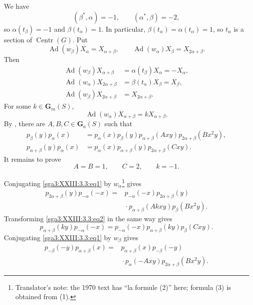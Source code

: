 We have
\[
  (\beta^*,\alpha)=-1,\qquad(\alpha^*,\beta)=-2,
\]
so \(\alpha(t_\beta)=-1\) and \(\beta(t_\alpha)=1\). In particular,
\(\beta(t_\alpha)=\alpha(t_\alpha)=1\), so \(t_\alpha\) is a section
of \(\operatorname{Centr}(G)\). Put
\[
  \operatorname{Ad}(w_\beta)X_\alpha=X_{\alpha+\beta},
  \qquad
  \operatorname{Ad}(w_\alpha)X_\beta=X_{2\alpha+\beta}.
\]
Then
\[
\begin{aligned}
  \operatorname{Ad}(w_\beta)X_{\alpha+\beta}
    &=\alpha(t_\beta)X_\alpha=-X_\alpha,\\
  \operatorname{Ad}(w_\alpha)X_{2\alpha+\beta}
    &=\beta(t_\alpha)X_\beta=X_\beta,\\
  \operatorname{Ad}(w_\beta)X_{2\alpha+\beta}
    &=X_{2\alpha+\beta}.
\end{aligned}
\]
For some \(k\in\mathbf G_m(S)\),
\[
  \operatorname{Ad}(w_\alpha)X_{\alpha+\beta}
    =kX_{\alpha+\beta}.
\]
By , there are
\(A,B,C\in\mathbf G_a(S)\) such that
\begin{align}
  p_\beta(y)p_\alpha(x)
    &=p_\alpha(x)p_\beta(y)p_{\alpha+\beta}(Axy)
      p_{2\alpha+\beta}(Bx^2y), \tag{1}\label{sga3:XXIII:3.3:eq1}\\
  p_{\alpha+\beta}(y)p_\alpha(x)
    &=p_\alpha(x)p_{\alpha+\beta}(y)
      p_{2\alpha+\beta}(Cxy). \tag{2}\label{sga3:XXIII:3.3:eq2}
\end{align}
It remains to prove
\[
  A=B=1,\qquad C=2,\qquad k=-1.
\]

Conjugating \eqref{sga3:XXIII:3.3:eq1} by \(w_\alpha\)\footnote{Translator's note: the 1970 text
has ``la formule (2)'' here; formula (3) is obtained from (1).} gives
\begin{equation}
\begin{aligned}
  p_{2\alpha+\beta}(y)p_{-\alpha}(-x)
    ={}&p_{-\alpha}(-x)p_{2\alpha+\beta}(y)\\
      &{}\cdot p_{\alpha+\beta}(Akxy)p_\beta(Bx^2y).
\end{aligned}
\tag{3}\label{sga3:XXIII:3.3:eq3}
\end{equation}
Transforming \eqref{sga3:XXIII:3.3:eq2} in the same way gives
\begin{equation}
  p_{\alpha+\beta}(ky)p_{-\alpha}(-x)
   =p_{-\alpha}(-x)p_{\alpha+\beta}(ky)p_\beta(Cxy).
\tag{4}\label{sga3:XXIII:3.3:eq4}
\end{equation}
Conjugating \eqref{sga3:XXIII:3.3:eq1} by \(w_\beta\) gives
\begin{equation}
\begin{aligned}
  p_{-\beta}(-y)p_{\alpha+\beta}(x)
    ={}&p_{\alpha+\beta}(x)p_{-\beta}(-y)\\
      &{}\cdot p_\alpha(-Axy)p_{2\alpha+\beta}(Bx^2y).
\end{aligned}
\tag{5}\label{sga3:XXIII:3.3:eq5}
\end{equation}


